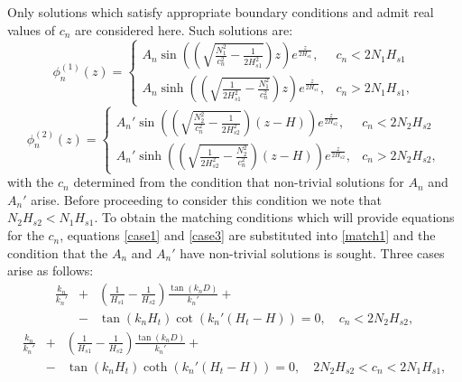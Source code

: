 \documentclass[a4paper,10pt]{article}
\begin{document}
Only solutions which satisfy appropriate boundary conditions and admit real values of $c_n$ are considered here. Such solutions are:
%
\begin{equation}
\label{case1}
\phi_n^{(1)}(z) = 
  \begin{cases} 
     A_n \sin   \left( \left( \sqrt{ \frac{N_1^2}{c_n^2}  - \frac{1}{2 H_{s1}^2} }   \right)  z \right) e^{\frac{z}{2 H_{s1}} } ,  & c_n < 2 N_1 H_{s1} \\
     A_n \sinh \left( \left( \sqrt{ \frac{1}{2 H_{s1}^2} - \frac{N_1^2}{c_n^2}}\right)  z \right) e^{\frac{z}{2H_{s1}} } ,  & c_n > 2 N_1 H_{s1},
   \end{cases}
\end{equation}
%
\begin{equation}
\label{case3}
\phi_n^{(2)}(z) = 
  \begin{cases} 
    A_n' \sin   \left( \left( \sqrt{ \frac{N_2^2}{c_n^2} - \frac{1}{2 H_{s2}^2} }     \right) ( z -H ) \right) e^{\frac{z}{2H_{s2}} } ,  & c_n < 2 N_2 H_{s2} \\
    A_n ' \sinh \left( \left( \sqrt{ \frac{1}{2 H_{s2}^2}      - \frac{N_2^2}{c_n^2}} \right) ( z -H ) \right) e^{\frac{z}{2H_{s2}} } ,  & c_n > 2 N_2 H_{s2},
   \end{cases}
\end{equation}
%
with the $c_n$ determined from the condition that non-trivial solutions for $A_n$ and $A_n '$ arise. 
Before proceeding to consider this condition we note that $N_2 H_{s2} < N_1 H_{s1}$. 
To obtain the matching conditions which will provide equations for the $c_n$, equations \ref{case1} and \ref{case3} are substituted into \ref{match1}
and the condition that the $A_n$ and $A_n'$ have non-trivial solutions is sought. Three cases arise as follows:
%
\begin{eqnarray}
\label{case1_se}
\frac{k_n }{ k_n ' } & + & \left( \frac{1}{H_{s1}} - \frac{1}{H_{s2}} \right) \frac{\tan (k_n D) }{ k_n ' } + \\  \nonumber
                            &  - & \tan \left( k_n H_t \right) \cot \left( k_n ' (H_t - H )\right) = 0, \quad  c_n < 2 N_2 H_{s2},
\end{eqnarray}
%
\begin{eqnarray}
\label{case2_se}
\frac{k_n }{ k_n ' }  & + & \left( \frac{1}{H_{s1}} - \frac{1}{H_{s2}} \right) \frac{\tan (k_n D) }{ k_n ' } + \\  \nonumber
                             &  - & \tan \left( k_n H_t \right) \coth \left( k_n ' (H_t - H )\right) = 0, \quad 2 N_2 H_{s2} < c_n  < 2 N_1 H_{s1} ,
\end{eqnarray}
\end{document}
